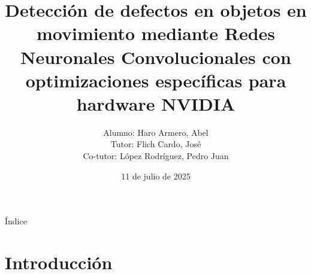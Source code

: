 \documentclass[spanish]{beamer}
\title{Detección de defectos en objetos en movimiento mediante Redes Neuronales Convolucionales con optimizaciones específicas para hardware NVIDIA}
\date{11 de julio de 2025}
\author{Alumno: Haro Armero, Abel \\ Tutor: Flich Cardo, José \\ Co-tutor: López Rodríguez, Pedro Juan}
\begin{document}
\begin{frame}
    \titlepage
\end{frame}

\begin{frame}{Índice}
    \small\tableofcontents
\end{frame}

\section{Introducción}

\footnotesize
\end{document}
